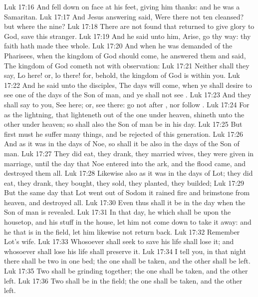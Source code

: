 \vs Luk 17:16 And fell down on  face at his feet, giving him thanks: and he was a Samaritan.
\vs Luk 17:17 And Jesus answering said, Were there not ten cleansed? but where  the nine?
\vs Luk 17:18 There are not found that returned to give glory to God, save this stranger.
\vs Luk 17:19 And he said unto him, Arise, go thy way: thy faith hath made thee whole.
\vs Luk 17:20 And when he was demanded of the Pharisees, when the kingdom of God should come, he answered them and said, The kingdom of God cometh not with observation:
\vs Luk 17:21 Neither shall they say, Lo here! or, lo there! for, behold, the kingdom of God is within you.
\vs Luk 17:22 And he said unto the disciples, The days will come, when ye shall desire to see one of the days of the Son of man, and ye shall not see .
\vs Luk 17:23 And they shall say to you, See here; or, see there: go not after , nor follow .
\vs Luk 17:24 For as the lightning, that lighteneth out of the one  under heaven, shineth unto the other  under heaven; so shall also the Son of man be in his day.
\vs Luk 17:25 But first must he suffer many things, and be rejected of this generation.
\vs Luk 17:26 And as it was in the days of Noe, so shall it be also in the days of the Son of man.
\vs Luk 17:27 They did eat, they drank, they married wives, they were given in marriage, until the day that Noe entered into the ark, and the flood came, and destroyed them all.
\vs Luk 17:28 Likewise also as it was in the days of Lot; they did eat, they drank, they bought, they sold, they planted, they builded;
\vs Luk 17:29 But the same day that Lot went out of Sodom it rained fire and brimstone from heaven, and destroyed  all.
\vs Luk 17:30 Even thus shall it be in the day when the Son of man is revealed.
\vs Luk 17:31 In that day, he which shall be upon the housetop, and his stuff in the house, let him not come down to take it away: and he that is in the field, let him likewise not return back.
\vs Luk 17:32 Remember Lot's wife.
\vs Luk 17:33 Whosoever shall seek to save his life shall lose it; and whosoever shall lose his life shall preserve it.
\vs Luk 17:34 I tell you, in that night there shall be two  in one bed; the one shall be taken, and the other shall be left.
\vs Luk 17:35 Two  shall be grinding together; the one shall be taken, and the other left.
\vs Luk 17:36 Two  shall be in the field; the one shall be taken, and the other left.

